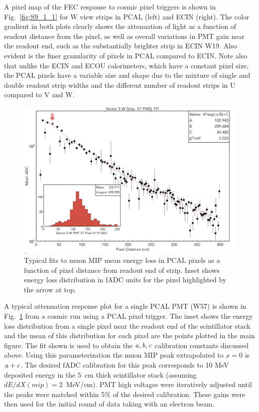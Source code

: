 A pixel map of the FEC response to cosmic pixel triggers is shown in Fig.~\ref{fig:S9_1_1} for W view strips in PCAL (left) and ECIN (right). The color gradient in both plots clearly shows the attenuation of light as a function of readout distance from the pixel, as well as overall variations in PMT gain near the readout end, such as the substantially brighter strip in ECIN W19.  Also evident is the finer granularity of pixels in PCAL compared to ECIN.  Note also that unlike the ECIN and ECOU calorimeters, which have a constant pixel size, the PCAL pixels have a variable size and shape due to the mixture of single and double readout strip widths and the different number of readout strips in U compared to V and W. 
\begin{figure}[hbt]
\centering
\includegraphics[width=1.0\columnwidth,keepaspectratio]{img/S9_1_2.png}
\caption[]{Typical fits to muon MIP mean energy loss in PCAL pixels as a function of pixel distance from readout end of strip. Inset shows energy loss distribution in fADC units for the pixel highlighted by the arrow at top.}
\label{fig:S9_1_2}
\end{figure}

A typical attenuation response plot for a single PCAL PMT (W57) is shown in Fig.~\ref{fig:S9_1_2} from a cosmic run using a PCAL pixel trigger.  The inset shows the energy loss distribution from a single pixel near the readout end of the scintillator stack and the mean of this distribution for each pixel are the points plotted in the main figure.  The fit shown is used to obtain the $\it{a,b,c}$ calibration constants discussed above.  Using this parameterization the muon MIP peak extrapolated to $x=0$ is $\it{a+c}$.   The desired fADC calibration for this peak corresponds to 10 MeV deposited energy in the 5~cm thick scintillator stack (assuming $dE/dX(mip)=2$~MeV/cm).  PMT high voltages were iteratively adjusted until the peaks were matched within 5\% of the desired calibration.   These gains were then used for the initial round of data taking with an electron beam.

